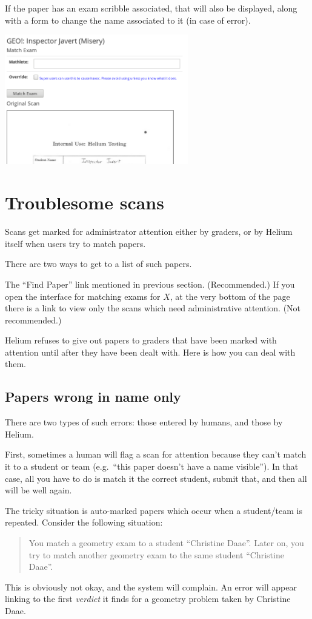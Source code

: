 If the paper has an exam scribble associated,
that will also be displayed,
along with a form to change the name associated to it
(in case of error).

\begin{center}
	\includegraphics[width=0.6\textwidth]{images/viewpaper1.png}
\end{center}

\section{Troublesome scans}
Scans get marked for administrator attention either by graders,
or by Helium itself when users try to match papers.

There are two ways to get to a list of such papers.
\begin{itemize}
	\ii The ``Find Paper'' link mentioned in previous section. (Recommended.)
	\ii If you open the interface for matching exams for $X$,
	at the very bottom of the page there is a link
	to view only the scans which need administrative attention.
	(Not recommended.)
\end{itemize}
Helium refuses to give out papers to graders
that have been marked with attention until after they have been dealt with.
Here is how you can deal with them.

\subsection{Papers wrong in name only}
There are two types of such errors:
those entered by humans, and those by Helium.

First, sometimes a human will flag a scan for attention
because they can't match it to a student or team
(e.g.\ ``this paper doesn't have a name visible'').
In that case, all you have to do is match it the correct student,
submit that, and then all will be well again.

The tricky situation is auto-marked papers
which occur when a student/team is repeated.
Consider the following situation:
\begin{quote}
	You match a geometry exam to a student ``Christine Daae''.  
	Later on, you try to match another geometry exam
	to the same student ``Christine Daae''.
\end{quote}
This is obviously not okay, and the system will complain.
An error will appear linking to the first \emph{verdict}
it finds for a geometry problem taken by Christine Daae.

